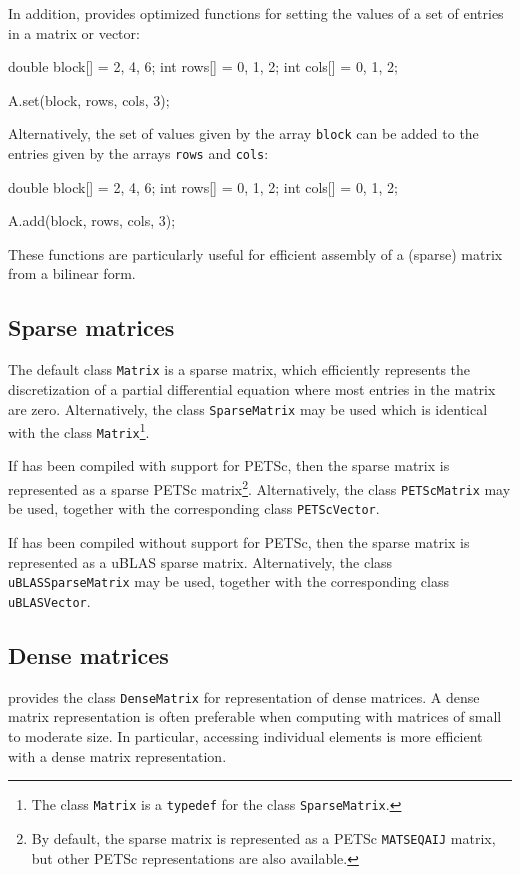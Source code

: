 In addition, \dolfin{} provides optimized functions for setting the
values of a set of entries in a matrix or vector:
\begin{code}
double block[] = {2, 4, 6};
int rows[] = {0, 1, 2};
int cols[] = {0, 1, 2};
  
A.set(block, rows, cols, 3);
\end{code}
Alternatively, the set of values given by the array \texttt{block} can
be added to the entries given by the arrays \texttt{rows} and
\texttt{cols}:
\begin{code}
double block[] = {2, 4, 6};
int rows[] = {0, 1, 2};
int cols[] = {0, 1, 2};
  
A.add(block, rows, cols, 3);
\end{code}
These functions are particularly useful for efficient assembly of a (sparse)
matrix from a bilinear form.

\subsection{Sparse matrices}

The default \dolfin{} class \texttt{Matrix} is a sparse matrix, which
efficiently represents the discretization of a partial differential
equation where most entries in the matrix are zero. Alternatively,
the class \texttt{SparseMatrix} may be used which is identical with
the class \texttt{Matrix}\footnote{The class \texttt{Matrix} is a
\texttt{typedef} for the class \texttt{SparseMatrix}.}.

If \dolfin{} has been compiled with support for PETSc, then the sparse
matrix is represented as a sparse PETSc matrix\footnote{By default, the
sparse matrix is represented as a PETSc \texttt{MATSEQAIJ} matrix, but
other PETSc representations are also available.}. Alternatively, the
class \texttt{PETScMatrix} may be used, together with the corresponding
class \texttt{PETScVector}.

If \dolfin{} has been compiled without support for PETSc, then the
sparse matrix is represented as a uBLAS sparse matrix. Alternatively,
the class \texttt{uBLASSparseMatrix} may be used, together with the
corresponding class \texttt{uBLASVector}.

\subsection{Dense matrices}

\dolfin{} provides the class \texttt{DenseMatrix} for representation
of dense matrices. A dense matrix representation is often preferable
when computing with matrices of small to moderate size. In particular,
accessing individual elements 
is more efficient with a dense matrix representation.

